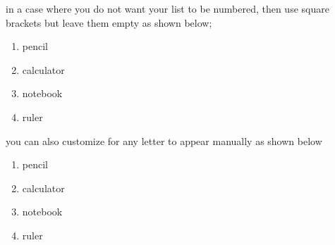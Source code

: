 \documentclass[a4paper,12pt]{article}
\begin{document}
  	in a case where you do not want your list to be numbered, then use square brackets but leave them empty as shown below;
  	
  	\begin {enumerate}[]
  	\item pencil
  	\item calculator
  	\item notebook
  	\item ruler
  	\end{enumerate}
  	
  	you can also customize for any letter to appear manually as shown below
  	\vspace{0.1cm}
  	\begin {enumerate}
  	\item[one.] pencil
  	\item[a.] calculator
  	\item[23.] notebook
  	\item ruler
  	\end{enumerate}
  	
  	
\end{document}
